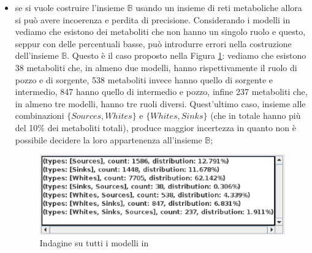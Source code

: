 \begin{itemize}
\item se si vuole costruire l'insieme $\mathbb{B}$ usando un insieme
  di reti metaboliche allora si pu\`o avere incoerenza e perdita di
  precisione. Considerando i modelli in \cite{MetExplore} vediamo che
  esistono dei metaboliti che non hanno un singolo ruolo e questo,
  seppur con delle percentuali basse, pu\`o introdurre errori nella
  costruzione dell'insieme $\mathbb{B}$. Questo \`e il caso proposto
  nella Figura \ref{fig:ResultViewer-MetExplore-models}: vediamo che
  esistono 38 metaboliti che, in almeno due modelli, hanno
  rispettivamente il ruolo di pozzo e di sorgente, 538 metaboliti
  invece hanno quello di sorgente e intermedio, 847 hanno quello di
  intermedio e pozzo, infine 237 metaboliti che, in almeno tre
  modelli, hanno tre ruoli diversi. Quest'ultimo caso, insieme alle
  combinazioni $\{Sources, Whites\}$ e $\{Whites, Sinks\}$ (che in
  totale hanno pi\`u del 10\% dei metaboliti totali), produce maggior
  incertezza in quanto non \`e possibile decidere la loro appartenenza
  all'insieme $\mathbb{B}$;
  \begin{figure}
    \centering
    \includegraphics[scale=.7]{images/ResultViewer-grouping-table-zoom}
    \caption{Indagine su tutti i modelli in \cite{MetExplore}}
    \label{fig:ResultViewer-MetExplore-models}
  \end{figure}


\end{itemize}
